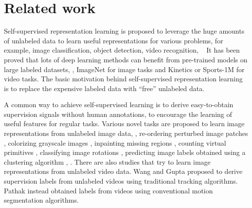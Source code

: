 \documentclass[10pt,twocolumn,letterpaper]{article}
\begin{document}
\section{Related work}

Self-supervised representation learning is proposed to leverage the huge amounts of unlabeled data to learn useful representations for various problems, for example, image classification, object detection, video recognition, \etc~
It has been proved that lots of deep learning methods can benefit from pre-trained models on large labeled datasets, \eg, ImageNet \cite{deng2009imagenet} for image tasks and Kinetics \cite{kay2017kinetics} or Sports-1M \cite{karpathy2014large} for video tasks. 
The basic motivation behind self-supervised representation learning is to replace the expensive labeled data with ``free'' unlabeled data. 

A common way to achieve self-supervised learning is to derive easy-to-obtain supervision signals without human annotations, to encourage the learning of useful features for regular tasks.
Various novel tasks are proposed to learn image representations from unlabeled image data, \eg, re-ordering perturbed image patches \cite{doersch2015unsupervised,noroozi2016unsupervised}, colorizing grayscale images \cite{zhang2016colorful}, inpainting missing regions \cite{pathak2016context}, counting virtual primitives \cite{noroozi2017representation}, classifying image rotations \cite{gidaris2018unsupervised}, predicting image labels obtained using a clustering algorithm \cite{caron2018deep}, \etc. 
There are also studies that try to learn image representations from unlabeled video data. 
Wang and Gupta \cite{wang2015unsupervised} proposed to derive supervision labels from unlabeled videos using traditional tracking algorithms. 
Pathak \etal \cite{pathak2017learning} instead obtained labels from videos using conventional motion segmentation algorithms. 
\end{document}
